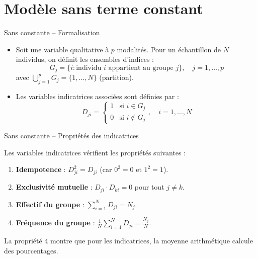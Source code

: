 \documentclass[11pt,aspectratio=169]{beamer}
\begin{document}
\section{Modèle sans terme constant}

\begin{frame}{Sans constante -- Formalisation}

\begin{itemize}

\item Soit une variable qualitative à $p$ modalités. Pour un échantillon de $N$ individus, on définit les ensembles d'indices :
  \[
  G_j = \{i : \text{individu } i \text{ appartient au groupe } j\}, \quad j = 1, \ldots, p
  \]
  avec $\bigcup_{j=1}^{p} G_j = \{1, \ldots, N\}$ (partition).\newline

\item Les variables indicatrices associées sont définies par :
  \[
  D_{ji} = \begin{cases}
      1 & \text{si } i \in G_j \\
      0 & \text{si } i \notin G_j
  \end{cases}, \quad i = 1, \ldots, N
  \]

\end{itemize}

\end{frame}

\begin{frame}{Sans constante -- Propriétés des indicatrices}

Les variables indicatrices vérifient les propriétés suivantes :

\begin{enumerate}

\item \textbf{Idempotence} : $D_{ji}^2 = D_{ji}$ \quad (car $0^2 = 0$ et $1^2 = 1$).\newline

\item \textbf{Exclusivité mutuelle} : $D_{ji} \cdot D_{ki} = 0$ pour tout $j \neq k$.\newline

\item \textbf{Effectif du groupe} : $\displaystyle\sum_{i=1}^{N} D_{ji} = N_j$.\newline

\item \textbf{Fréquence du groupe} : $\displaystyle\frac{1}{N} \sum_{i=1}^{N} D_{ji} = \frac{N_j}{N}$.

\end{enumerate}

\vspace{0.3cm}

La propriété 4 montre que pour les indicatrices, la moyenne arithmétique calcule des pourcentages.

\end{frame}
\end{document}

